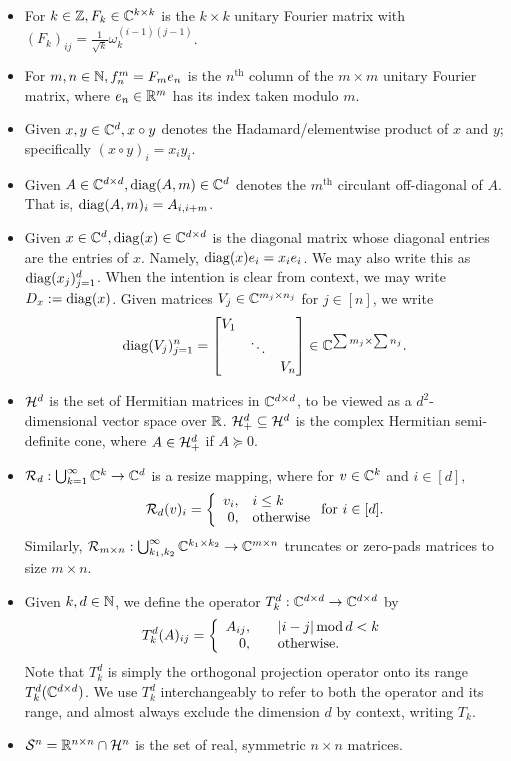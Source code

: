 \begin{itemize}
\item For $k \in \mathbb{Z}, F_k \in \mathbb{C}^{k \times k}$ is the $k \times k$ unitary Fourier matrix with $(F_k)_{ij} = \frac{1}{\sqrt{k}} \omega_k^{(i-1)(j-1)}$.
  \item For $m, n \in \mathbb{N}, f_n^m = F_m e_n$ is the $n^{\text{th}}$ column of the $m \times m$ unitary Fourier matrix, where $e_n \in \mathbb{R}^m$ has its index taken modulo $m$.
\item Given $x, y \in \mathbb{C}^d, x \circ y$ denotes the Hadamard/elementwise product of $x$ and $y$; specifically $(x \circ y)_i = x_i y_i$.
\item Given $A \in \mathbb{C}^{d \times d}, \operatorname{diag}(A, m) \in \mathbb{C}^d$ denotes the $m^{\text{th}}$ circulant off-diagonal of $A$.  That is, $\operatorname{diag}(A, m)_i = A_{i, i + m}$.
\item Given $x \in \mathbb{C}^d, \operatorname{diag}(x) \in \mathbb{C}^{d \times d}$ is the diagonal matrix whose diagonal entries are the entries of $x$.  Namely, $\operatorname{diag}(x) e_i = x_i e_i$.  We may also write this as $\operatorname{diag}(x_j)_{j = 1}^d$.  When the intention is clear from context, we may write $D_x := \operatorname{diag}(x)$.  Given matrices $V_j \in \mathbb{C}^{m_j \times n_j}$ for $j \in [n]$, we write \[\operatorname{diag}(V_j)_{j = 1}^n = \begin{bmatrix} V_1 & & \\ & \ddots & \\ & & V_n \end{bmatrix} \in \mathbb{C}^{\sum m_j \times \sum n_j}.\]
  \item $\mathcal{H}^d$ is the set of Hermitian matrices in $\mathbb{C}^{d \times d}$, to be viewed as a $d^2$-dimensional vector space over $\mathbb{R}$.  $\mathcal{H}^d_+ \subseteq \mathcal{H}^d$ is the complex Hermitian semi-definite cone, where $A \in \mathcal{H}^d_+$ if $A \succeq 0$.
  \item $\mathcal{R}_d : \bigcup_{k = 1}^\infty \mathbb{C}^k \to \mathbb{C}^d$ is a resize mapping, where for $v \in \mathbb{C}^k$ and $i \in [d],$ $$\mathcal{R}_d(v)_i = \left\{\begin{array}{r@{,\quad}l} v_i & i \le k \\ 0 & \text{otherwise} \end{array}\right. \text{for}\ i \in [d].$$  Similarly, $\mathcal{R}_{m \times n} : \bigcup_{k_1, k_2}^\infty \mathbb{C}^{k_1 \times k_2} \to \mathbb{C}^{m \times n}$ truncates or zero-pads matrices to size $m \times n.$
  \item Given $k, d \in \mathbb{N}$, we define the operator $T^d_k : \mathbb{C}^{d \times d} \to \mathbb{C}^{d \times d}$ by \[T_k^d(A)_{ij} = \left\{\begin{array}{r@{,\qquad}l} A_{ij} & |i - j| \mod d < k \\ 0 & \text{otherwise}. \end{array}\right.\]  Note that $T^d_k$ is simply the orthogonal projection operator onto its range $T_k^d(\mathbb{C}^{d \times d})$.  We use $T^d_k$ interchangeably to refer to both the operator and its range, and almost always exclude the dimension $d$ by context, writing $T_k$.
  \item $\mathcal{S}^n = \mathbb{R}^{n \times n} \cap \mathcal{H}^n$ is the set of real, symmetric $n \times n$ matrices.
    
    
\end{itemize}
